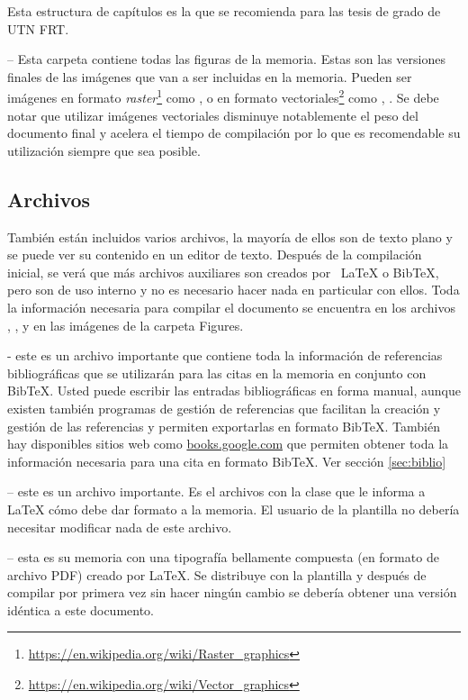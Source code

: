 Esta estructura de capítulos es la que se recomienda para las tesis de grado de UTN FRT.

 -- Esta carpeta contiene todas las figuras de la memoria.  Estas son las versiones finales de las imágenes que van a ser incluidas en la memoria.  Pueden ser imágenes en formato \textit{raster}\footnote{\url{https://en.wikipedia.org/wiki/Raster_graphics}} como ,  o en formato vectoriales\footnote{\url{https://en.wikipedia.org/wiki/Vector_graphics}} como , .  Se debe notar que utilizar imágenes vectoriales disminuye notablemente el peso del documento final y acelera el tiempo de compilación por lo que es recomendable su utilización siempre que sea posible.

\subsection{Archivos}

También están incluidos varios archivos, la mayoría de ellos son de texto plano y se puede ver su contenido en un editor de texto. Después de la compilación inicial, se verá que más archivos auxiliares son creados por \ LaTeX{} o BibTeX, pero son de uso interno y no es necesario hacer nada en particular con ellos.  Toda la información necesaria para compilar el documento se encuentra en los archivos , ,  y en las imágenes de la carpeta Figures.

 - este es un archivo importante que contiene toda la información de referencias bibliográficas que se utilizarán para las citas en la memoria en conjunto con BibTeX. Usted puede escribir las entradas bibliográficas en forma manual, aunque existen también programas de gestión de referencias que facilitan la creación y gestión de las referencias y permiten exportarlas en formato BibTeX.  También hay disponibles sitios web como \url{books.google.com} que permiten obtener toda la información necesaria para una cita en formato BibTeX. Ver sección \ref{sec:biblio}

 -- este es un archivo importante. Es el archivos con la clase que le informa a \LaTeX{} cómo debe dar formato a la memoria. El usuario de la plantilla no debería necesitar modificar nada de este archivo.

 -- esta es su memoria con una tipografía bellamente compuesta (en formato de archivo PDF) creado por \LaTeX{}. Se distribuye con la plantilla y después de compilar por primera vez sin hacer ningún cambio se debería obtener una versión idéntica a este documento.

